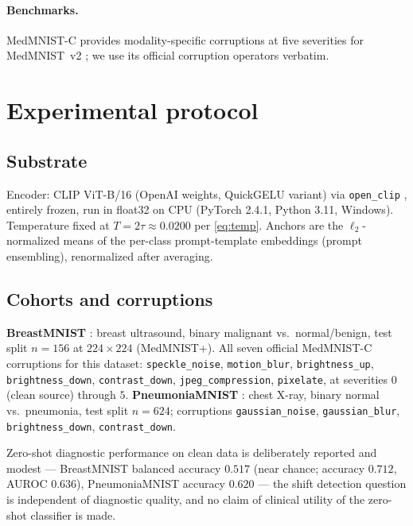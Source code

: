 \documentclass[11pt]{article}
\begin{document}
\paragraph{Benchmarks.} MedMNIST-C \citep{disalvo2025medmnistc} provides
modality-specific corruptions at five severities for MedMNIST~v2
\citep{yang2023medmnist}; we use its official corruption operators verbatim.

\section{Experimental protocol}
\label{sec:protocol}

\subsection{Substrate}

Encoder: CLIP ViT-B/16 (OpenAI weights, QuickGELU variant) via
\texttt{open\_clip} \citep{ilharco2021openclip}, entirely frozen, run in
float32 on CPU (PyTorch 2.4.1, Python 3.11, Windows). Temperature fixed at
$T = 2\tau \approx 0.0200$ per \eqref{eq:temp}. Anchors are the
$\ell_2$-normalized means of the per-class prompt-template embeddings
(prompt ensembling), renormalized after averaging.

\subsection{Cohorts and corruptions}

\textbf{BreastMNIST} \citep{yang2023medmnist,aldhabyani2020busi}: breast
ultrasound, binary malignant vs.\ normal/benign, test split $n=156$ at
$224\times224$ (MedMNIST+). All seven official MedMNIST-C corruptions for
this dataset: \texttt{speckle\_noise}, \texttt{motion\_blur},
\texttt{brightness\_up}, \texttt{brightness\_down}, \texttt{contrast\_down},
\texttt{jpeg\_compression}, \texttt{pixelate}, at severities $0$ (clean
source) through $5$.
\textbf{PneumoniaMNIST} \citep{kermany2018pneumonia}: chest X-ray, binary
normal vs.\ pneumonia, test split $n=624$; corruptions
\texttt{gaussian\_noise}, \texttt{gaussian\_blur}, \texttt{brightness\_down},
\texttt{contrast\_down}.

Zero-shot diagnostic performance on clean data is deliberately reported and
modest --- BreastMNIST balanced accuracy $0.517$ (near chance; accuracy
$0.712$, AUROC $0.636$), PneumoniaMNIST accuracy $0.620$ --- the shift
detection question is independent of diagnostic quality, and no claim of
clinical utility of the zero-shot classifier is made.
\end{document}
